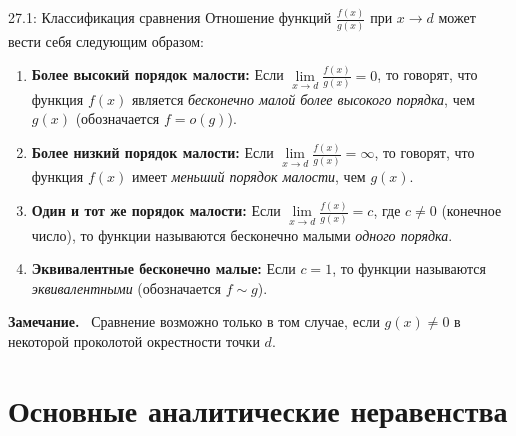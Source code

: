 \documentclass[a4paper,12pt]{article}
\newcommand{\myremark}{\textbf{Замечание.}\ }
\begin{document}
	\begin{definitionbox}{27.1: Классификация сравнения}
		Отношение функций $\frac{f(x)}{g(x)}$ при $x \to d$ может вести себя следующим образом:
		
		\begin{enumerate}
			\item \textbf{Более высокий порядок малости:}
			Если $\lim\limits_{x \to d} \frac{f(x)}{g(x)} = 0$, то говорят, что функция $f(x)$ является \textit{бесконечно малой более высокого порядка}, чем $g(x)$ (обозначается $f = o(g)$).
			
			\item \textbf{Более низкий порядок малости:}
			Если $\lim\limits_{x \to d} \frac{f(x)}{g(x)} = \infty$, то говорят, что функция $f(x)$ имеет \textit{меньший порядок малости}, чем $g(x)$.
			
			\item \textbf{Один и тот же порядок малости:}
			Если $\lim\limits_{x \to d} \frac{f(x)}{g(x)} = c$, где $c \neq 0$ (конечное число), то функции называются бесконечно малыми \textit{одного порядка}.
			
			\item \textbf{Эквивалентные бесконечно малые:}
			Если $c = 1$, то функции называются \textit{эквивалентными} (обозначается $f \sim g$).
		\end{enumerate}
	\end{definitionbox}
	
	\begin{center}
	\end{center}
	
	\myremark
	Сравнение возможно только в том случае, если $g(x) \neq 0$ в некоторой проколотой окрестности точки $d$.
	
	
	
	
	\newpage
	\section{Основные аналитические неравенства}
	
\end{document}
